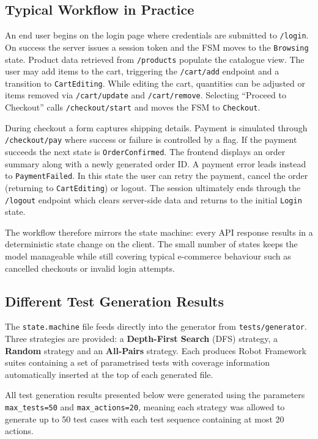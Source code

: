 \subsection{Typical Workflow in Practice}
An end user begins on the login page where credentials are submitted to
\texttt{/login}. On success the server issues a session token and the FSM moves
to the \texttt{Browsing} state. Product data retrieved from \texttt{/products}
populate the catalogue view. The user may add items to the cart, triggering the
\texttt{/cart/add} endpoint and a transition to \texttt{CartEditing}. While
editing the cart, quantities can be adjusted or items removed via
\texttt{/cart/update} and \texttt{/cart/remove}. Selecting ``Proceed to
Checkout'' calls \texttt{/checkout/start} and moves the FSM to \texttt{Checkout}.

During checkout a form captures shipping details. Payment is simulated through
\texttt{/checkout/pay} where success or failure is controlled by a flag. If the
payment succeeds the next state is \texttt{OrderConfirmed}. The frontend
displays an order summary along with a newly generated order ID. A payment error
leads instead to \texttt{PaymentFailed}. In this state the user can retry the
payment, cancel the order (returning to \texttt{CartEditing}) or logout. The
session ultimately ends through the \texttt{/logout} endpoint which clears
server-side data and returns to the initial \texttt{Login} state.

The workflow therefore mirrors the state machine: every API response results in
a deterministic state change on the client. The small number of states keeps the
model manageable while still covering typical e-commerce behaviour such as
cancelled checkouts or invalid login attempts.

\subsection{Different Test Generation Results}
The \texttt{state.machine} file feeds directly into the generator from
\texttt{tests/generator}. Three strategies are provided: a
\textbf{Depth-First Search} (DFS) strategy, a \textbf{Random} strategy and an
\textbf{All-Pairs} strategy. Each produces Robot Framework suites containing a
set of parametrised tests with coverage information automatically inserted at
the top of each generated file.

All test generation results presented below were generated using the parameters
\texttt{max\_tests=50} and \texttt{max\_actions=20}, meaning each strategy was
allowed to generate up to 50 test cases with each test sequence containing at
most 20 actions.

